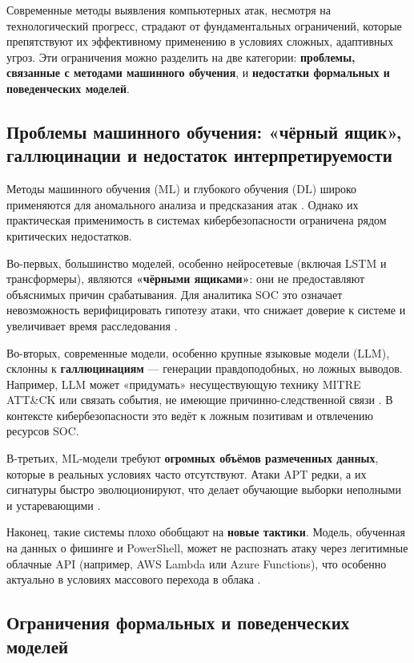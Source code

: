 Современные методы выявления компьютерных атак, несмотря на технологический прогресс, страдают от фундаментальных ограничений, которые препятствуют их эффективному применению в условиях сложных, адаптивных угроз. Эти ограничения можно разделить на две категории: \textbf{проблемы, связанные с методами машинного обучения}, и \textbf{недостатки формальных и поведенческих моделей}.

\subsection{Проблемы машинного обучения: «чёрный ящик», галлюцинации и недостаток интерпретируемости}

Методы машинного обучения (ML) и глубокого обучения (DL) широко применяются для аномального анализа и предсказания атак \cite{Shu2018, Sommer2010}. Однако их практическая применимость в системах кибербезопасности ограничена рядом критических недостатков.

Во-первых, большинство моделей, особенно нейросетевые (включая LSTM и трансформеры), являются \textbf{«чёрными ящиками»}: они не предоставляют объяснимых причин срабатывания. Для аналитика SOC это означает невозможность верифицировать гипотезу атаки, что снижает доверие к системе и увеличивает время расследования \cite{Rudin2019}.

Во-вторых, современные модели, особенно крупные языковые модели (LLM), склонны к \textbf{галлюцинациям} — генерации правдоподобных, но ложных выводов. Например, LLM может «придумать» несуществующую технику MITRE ATT\&CK или связать события, не имеющие причинно-следственной связи \cite{Bommasani2021}. В контексте кибербезопасности это ведёт к ложным позитивам и отвлечению ресурсов SOC.

В-третьих, ML-модели требуют \textbf{огромных объёмов размеченных данных}, которые в реальных условиях часто отсутствуют. Атаки APT редки, а их сигнатуры быстро эволюционируют, что делает обучающие выборки неполными и устаревающими \cite{Ring2019}.

Наконец, такие системы плохо обобщают на \textbf{новые тактики}. Модель, обученная на данных о фишинге и PowerShell, может не распознать атаку через легитимные облачные API (например, AWS Lambda или Azure Functions), что особенно актуально в условиях массового перехода в облака \cite{MITRE2023}.

\subsection{Ограничения формальных и поведенческих моделей}

